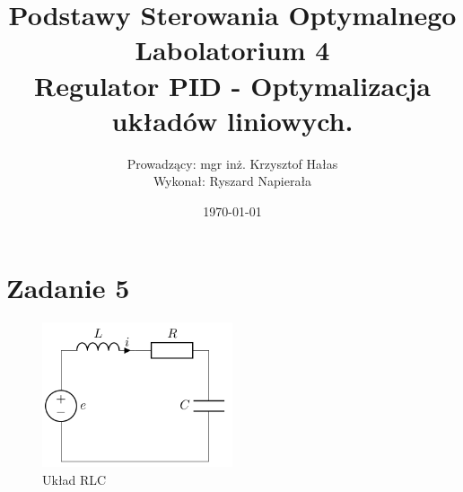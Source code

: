 \documentclass[12pt, letterpaper]{article}
\title{
    \huge Podstawy Sterowania Optymalnego\\Labolatorium 4\\
    \large Regulator PID - Optymalizacja układów liniowych.
}
\author{Prowadzący: mgr inż. Krzysztof Hałas\\
        Wykonał: Ryszard Napierała}
\date{\today}
\begin{document}
    \maketitle
    
    \section*{Zadanie 5}
        \begin{figure}[H]
            \centering
            \includegraphics[width=0.5\textwidth]{lab4/rys1}
            \caption{Układ RLC}
            \label{fig:rlc}
        \end{figure}
\end{document}
